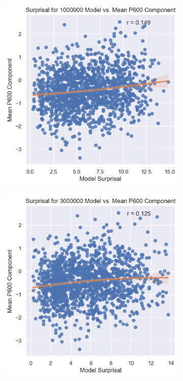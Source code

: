 \documentclass{IEEEtran}
\begin{document}
\begin{figure}[h]
    \centering
    \begin{subfigure}{0.4\textwidth}
        \centering
        \includegraphics[width=\textwidth]{surprisal_vs_p600/1000000.png}
    \end{subfigure}
    \begin{subfigure}{0.4\textwidth}
        \centering
        \includegraphics[width=\textwidth]{surprisal_vs_p600/3000000.png}
    \end{subfigure}
\end{figure}
\end{document}
